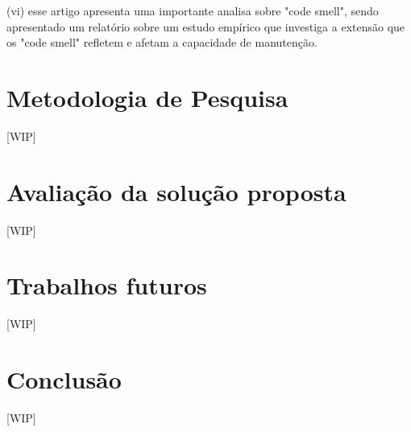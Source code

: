 \documentclass[12pt]{article}
\begin{document}
 (vi) \cite{CODE_SMELLS_REFLECT_IMPORTANT_MAINTAINABILITY_ASPECTS} esse artigo apresenta uma importante analisa sobre "code smell", sendo apresentado um relatório sobre um estudo empírico que investiga a extensão que os "code smell" refletem e afetam a capacidade de manutenção.

\part{Metodologia de Pesquisa} \label{sec:metodologia_Pesquisa}
[WIP]

\part{Avaliação da solução proposta} \label{sec:avaliacao}
[WIP]

\part{Trabalhos futuros} \label{sec:trabalhos_futuros}
[WIP]

\part{Conclusão} \label{sec:conclusao}
[WIP]




\end{document}

